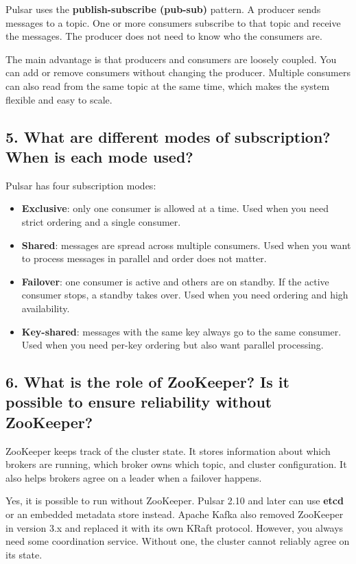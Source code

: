 \documentclass[11pt,a4paper]{article}
\begin{document}
Pulsar uses the \textbf{publish-subscribe (pub-sub)} pattern. A producer sends messages
to a topic. One or more consumers subscribe to that topic and receive the messages.
The producer does not need to know who the consumers are.

The main advantage is that producers and consumers are loosely coupled. You can add or
remove consumers without changing the producer. Multiple consumers can also read from
the same topic at the same time, which makes the system flexible and easy to scale.

\subsection*{5. What are different modes of subscription? When is each mode used?}

Pulsar has four subscription modes:

\begin{itemize}[leftmargin=1.5cm]
  \item \textbf{Exclusive}: only one consumer is allowed at a time. Used when you need
        strict ordering and a single consumer.
  \item \textbf{Shared}: messages are spread across multiple consumers. Used when you
        want to process messages in parallel and order does not matter.
  \item \textbf{Failover}: one consumer is active and others are on standby. If the active
        consumer stops, a standby takes over. Used when you need ordering and high availability.
  \item \textbf{Key-shared}: messages with the same key always go to the same consumer.
        Used when you need per-key ordering but also want parallel processing.
\end{itemize}

\subsection*{6. What is the role of ZooKeeper? Is it possible to ensure reliability without ZooKeeper?}

ZooKeeper keeps track of the cluster state. It stores information about which brokers are
running, which broker owns which topic, and cluster configuration. It also helps brokers
agree on a leader when a failover happens.

Yes, it is possible to run without ZooKeeper. Pulsar 2.10 and later can use \textbf{etcd} or
an embedded metadata store instead. Apache Kafka also removed ZooKeeper in version 3.x
and replaced it with its own KRaft protocol. However, you always need some coordination
service. Without one, the cluster cannot reliably agree on its state.
\end{document}
